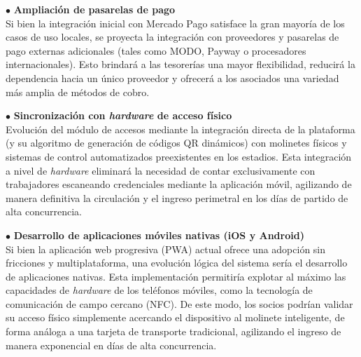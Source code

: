 \vspace{0.3cm}

\noindent $\bullet$ \textbf{Ampliación de pasarelas de pago}\\
Si bien la integración inicial con Mercado Pago satisface la gran mayoría de los casos de uso locales, se proyecta la integración con proveedores y pasarelas de pago externas adicionales (tales como MODO, Payway o procesadores internacionales). Esto brindará a las tesorerías una mayor flexibilidad, reducirá la dependencia hacia un único proveedor y ofrecerá a los asociados una variedad más amplia de métodos de cobro.

\vspace{0.3cm}

\noindent $\bullet$ \textbf{Sincronización con \textit{hardware} de acceso físico}\\
Evolución del módulo de accesos mediante la integración directa de la plataforma (y su algoritmo de generación de códigos QR dinámicos) con molinetes físicos y sistemas de control automatizados preexistentes en los estadios. Esta integración a nivel de \textit{hardware} eliminará la necesidad de contar exclusivamente con trabajadores escaneando credenciales mediante la aplicación móvil, agilizando de manera definitiva la circulación y el ingreso perimetral en los días de partido de alta concurrencia.

\vspace{0.3cm}

\noindent $\bullet$ \textbf{Desarrollo de aplicaciones móviles nativas (iOS y Android)}\\
Si bien la aplicación web progresiva (PWA) actual ofrece una adopción sin fricciones y multiplataforma, una evolución lógica del sistema sería el desarrollo de aplicaciones nativas. Esta implementación permitiría explotar al máximo las capacidades de \textit{hardware} de los teléfonos móviles, como la tecnología de comunicación de campo cercano (NFC). De este modo, los socios podrían validar su acceso físico simplemente acercando el dispositivo al molinete inteligente, de forma análoga a una tarjeta de transporte tradicional, agilizando el ingreso de manera exponencial en días de alta concurrencia.
